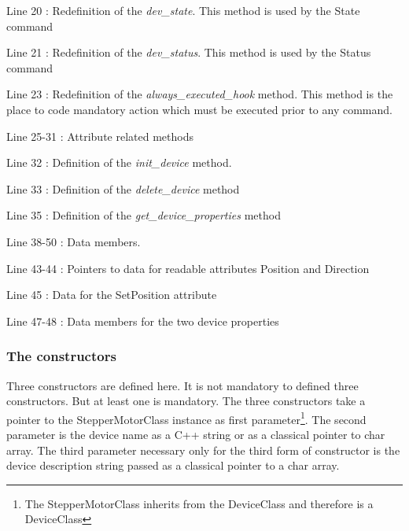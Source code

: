 Line 20 : Redefinition of the \emph{dev\_state}.
This method is used by the State command

Line 21 : Redefinition of the \emph{dev\_status}.
This method is used by the Status command

Line 23 : Redefinition of the \emph{always\_executed\_hook}
method. This method is the place to code mandatory action which must
be executed prior to any command.

Line 25-31 : Attribute related methods

Line 32 : Definition of the \emph{init\_device}
method.

Line 33 : Definition of the \emph{delete\_device}
method

Line 35 : Definition of the \emph{get\_device\_properties} method

Line 38-50 : Data members. 

Line 43-44 : Pointers to data for readable attributes Position and
Direction

Line 45 : Data for the SetPosition attribute

Line 47-48 : Data members for the two device properties

\subsubsection{The constructors}

Three constructors are defined here. It is not mandatory to defined
three constructors. But at least one is mandatory. The three constructors
take a pointer to the StepperMotorClass instance as first parameter\footnote{The StepperMotorClass inherits from the DeviceClass and therefore
is a DeviceClass}. The second parameter is the device name as a C++ string or as a
classical pointer to char array. The third parameter necessary only
for the third form of constructor is the device description string
passed as a classical pointer to a char array.

